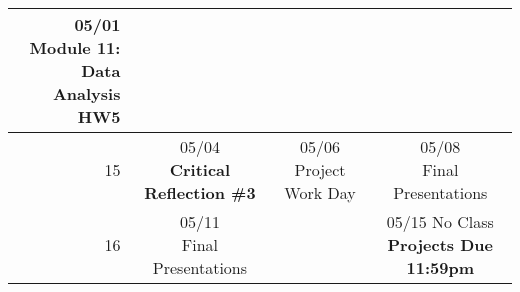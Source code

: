 \documentclass[11pt]{article}
\begin{document}
\begin{tabular}{| r | c | c | c |}
	\makecell{05/01 Module 11: \\Data Analysis \textbf{HW5}} \\
	\hline 15 &
	\makecell{05/04 \\ \textbf{Critical Reflection \#3}} &
	\makecell{05/06 \\Project Work Day} &
	\makecell{05/08 \\Final Presentations} \\
	\hline 16 &
	\makecell{05/11 \\Final Presentations} & 
	\makecell{} & 
	\makecell{05/15 No Class\\ \textbf{Projects Due 11:59pm}}\\
	\hline
\end{tabular}
\end{document}
